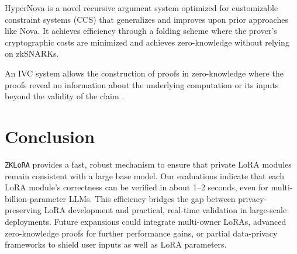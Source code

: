 \documentclass[11pt]{article}
\begin{document}
HyperNova \cite{kothapalli2024hypernova} is a novel recursive argument system optimized for customizable constraint systems (CCS) that generalizes and improves upon prior approaches like Nova. It achieves efficiency through a folding scheme where the prover’s cryptographic costs are minimized and achieves zero-knowledge without relying on zkSNARKs.

An IVC system allows the construction of proofs in zero-knowledge where the   proofs reveal no information about the underlying computation or its inputs beyond the validity of the claim \cite{valiant2008incrementally}.


\section{Conclusion}

\texttt{ZKLoRA} provides a fast, robust mechanism to ensure that private LoRA modules remain consistent with a large base model. Our evaluations indicate that each LoRA module’s correctness can be verified in about 1--2 seconds, even for multi-billion-parameter LLMs. This efficiency bridges the gap between privacy-preserving LoRA development and practical, real-time validation in large-scale deployments. Future expansions could integrate multi-owner LoRAs, advanced zero-knowledge proofs for further performance gains, or partial data-privacy frameworks to shield user inputs as well as LoRA parameters.



\end{document}

